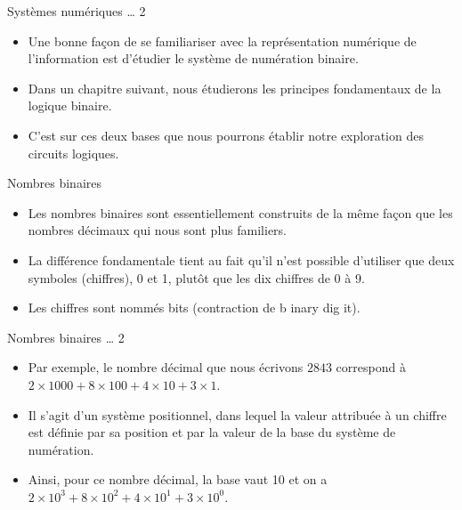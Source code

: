 \documentclass[presentation]{beamer}
\begin{document}
\begin{frame}[label={sec:org74efc37}]{Systèmes numériques \ldots{} 2}
\begin{itemize}
\item Une bonne façon de se familiariser avec la représentation numérique de l'information est d'étudier le système de numération binaire.

\item Dans un chapitre suivant, nous étudierons les principes fondamentaux de la logique binaire.

\item C'est sur ces deux bases que nous pourrons établir notre exploration des circuits logiques.
\end{itemize}
\end{frame}

\begin{frame}[label={sec:orgc5eb757}]{Nombres binaires}
\begin{itemize}
\item Les nombres binaires sont essentiellement construits de la même façon que les nombres décimaux qui nous sont plus familiers.

\item La différence fondamentale tient au fait qu'il n'est possible d'utiliser que deux symboles (chiffres), 0 et 1, plutôt que les dix chiffres de 0 à 9.

\item Les chiffres sont nommés bits (contraction de \alert{b} inary dig \alert{it}).
\end{itemize}
\end{frame}

\begin{frame}[label={sec:org7b1c901}]{Nombres binaires \ldots{} 2}
\begin{itemize}
\item Par exemple, le nombre décimal que nous écrivons \(2843\) correspond à \(2 \times 1000 + 8 \times 100 + 4 \times 10 + 3 \times 1\).

\item Il s'agit d'un système positionnel, dans lequel la valeur attribuée à un chiffre est définie par sa position et par la valeur de la \alert{base} du système de numération.

\item Ainsi, pour ce nombre décimal, la base vaut 10 et on a \(2 \times 10^3 + 8 \times 10^2 + 4 \times 10^1 + 3 \times 10^0\).
\end{itemize}
\end{frame}
\end{document}
